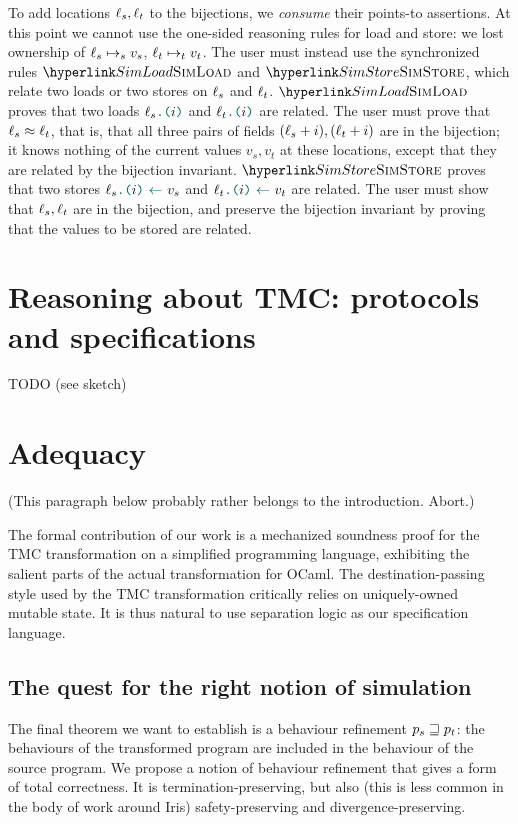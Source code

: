 To add locations $\ell_s, \ell_t$ to the bijections, we \emph{consume} their points-to assertions. At this point we cannot use the one-sided reasoning rules for load and store: we lost ownership of $\ell_s \mapsto_s v_s$, $\ell_t \mapsto_t v_t$.
%
The user must instead use the synchronized rules $\RefTirName{SimLoad}$ and $\RefTirName{SimStore}$, which relate two loads or two stores on $\ell_s$ and $\ell_t$.
%
$\RefTirName{SimLoad}$ proves that two loads $\lambdLoad{\loc_s}{i}$ and $\lambdLoad{\loc_t}{i}$ are related. The user must prove that $\ell_s \approx \ell_t$, that is, that all three pairs of fields $(\ell_s + i), (\ell_t + i)$ are in the bijection; it knows nothing of the current values $v_s, v_t$ at these locations, except that they are related by the bijection invariant.
%
$\RefTirName{SimStore}$ proves that two stores $\lambdStore{\loc_s}{i}{v_s}$ and $\lambdStore{\loc_t}{i}{v_t}$ are related. The user must show that $\ell_s, \ell_t$ are in the bijection, and preserve the bijection invariant by proving that the values to be stored are related.

\section{Reasoning about TMC: protocols and specifications}
\label{sec:TMC_protocols_and_specs}

TODO (see sketch)

\section{Adequacy}
\label{sec:soundness}
\label{sec:adequacy}

(This paragraph below probably rather belongs to the introduction. Abort.)

The formal contribution of our work is a mechanized soundness proof for the TMC transformation on a simplified programming language, exhibiting the salient parts of the actual transformation for OCaml.
%
The destination-passing style used by the TMC transformation critically relies on uniquely-owned mutable state.
%
It is thus natural to use separation logic as our specification language.

\subsection{The quest for the right notion of simulation}
\label{sec:howto-relation}

The final theorem we want to establish is a behaviour refinement $p_s \sqsupseteq p_t$: the behaviours of the transformed program are included in the behaviour of the source program.
%
We propose a notion of behaviour refinement that gives a form of total correctness.
%
It is termination-preserving, but also (this is less common in the body of work around Iris) safety-preserving and divergence-preserving.


